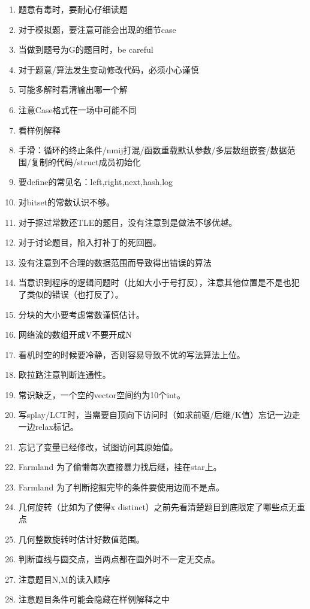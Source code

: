 \begin{enumerate}\setlength{\itemsep}{-\itemsep}
	\item 题意有毒时，要耐心仔细读题
	\item 对于模拟题，要注意可能会出现的细节case
	\item 当做到题号为G的题目时，be careful
	\item 对于题意/算法发生变动修改代码，必须小心谨慎
	\item 可能多解时看清输出哪一个解
	\item 注意Case格式在一场中可能不同
	\item 看样例解释
	\item 手滑：循环的终止条件/nmij打混/函数重载默认参数/多层数组嵌套/数据范围/复制的代码/struct成员初始化
	\item 要define的常见名：left,right,next,hash,log
	\item 对bitset的常数认识不够。
	\item 对于抠过常数还TLE的题目，没有注意到是做法不够优越。
	\item 对于讨论题目，陷入打补丁的死回圈。
	\item 没有注意到不合理的数据范围而导致得出错误的算法
	\item 当意识到程序的逻辑问题时（比如大小于号打反），注意其他位置是不是也犯了类似的错误（也打反了）。
	\item 分块的大小要考虑常数谨慎估计。
	\item 网络流的数组开成V不要开成N
	\item 看机时空的时候要冷静，否则容易导致不优的写法算法上位。
	\item 欧拉路注意判断连通性。
	\item 常识缺乏，一个空的vector空间约为10个int。
	\item 写splay/LCT时，当需要自顶向下访问时（如求前驱/后继/K值）忘记一边走一边relax标记。
	\item 忘记了变量已经修改，试图访问其原始值。
	\item Farmland 为了偷懒每次直接暴力找后继，挂在star上。
	\item Farmland 为了判断挖掘完毕的条件要使用边而不是点。
	\item 几何旋转（比如为了使得x distinct）之前先看清楚题目到底限定了哪些点无重点
	\item 几何整数旋转时估计好数值范围。
	\item 判断直线与圆交点，当两点都在圆外时不一定无交点。
	\item 注意题目N,M的读入顺序
	\item 注意题目条件可能会隐藏在样例解释之中

\end{enumerate}
